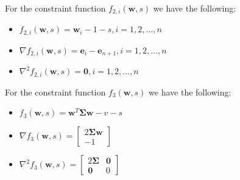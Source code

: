 \documentclass{beamer}
\begin{document}
\begin{frame}

\justifying
For the constraint function $f_{2,i}\left(\mathbf{w},s\right)$ we have the following:
\begin{itemize}
	\item $f_{2,i}\left(\mathbf{w},s\right) = \mathbf{w}_{i} - 1 - s, i=1,2,\dots,n$
	\item $\nabla f_{2,i}\left(\mathbf{w},s\right) = \mathbf{e}_{i} - \mathbf{e}_{n+1}, i=1,2,\dots,n$
	\item $\nabla^{2}f_{2,i}\left(\mathbf{w},s\right) = \mathbf{0}, i=1,2,\dots,n$
\end{itemize}

\vspace{0.8cm}
\justifying
For the constraint function $f_{3}\left(\mathbf{w},s\right)$ we have the following:
\begin{itemize}
	\item $f_{3}\left(\mathbf{w},s\right) = \mathbf{w}^{T}\mathbf{\Sigma}\mathbf{w} - v - s$
	\item $\nabla f_{3}\left(\mathbf{w},s\right) = \begin{bmatrix}
										2\mathbf{\Sigma}\mathbf{w}\\
										-1
									\end{bmatrix}$
	\item $\nabla^{2}f_{3}\left(\mathbf{w},s\right) = \begin{bmatrix}
										2\mathbf{\Sigma} & \mathbf{0}\\
										\mathbf{0} & 0
									\end{bmatrix}$
\end{itemize}

\end{frame}
\end{document}
